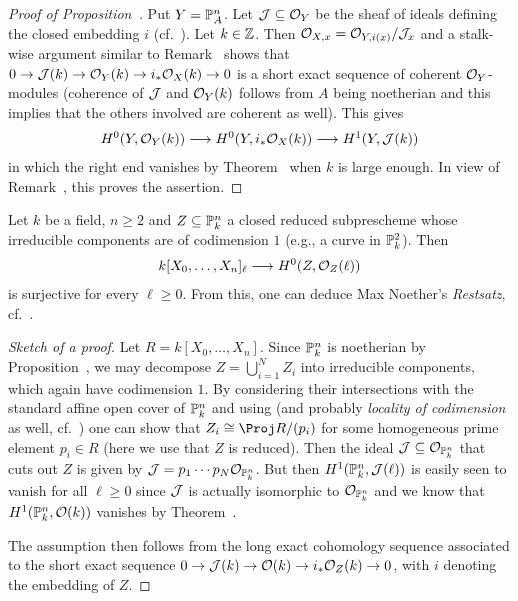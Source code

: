\documentclass[a4paper,parskip=half,numbers=enddot, DIV=12]{scrreprt}
\renewcommand{\geq}{\geqslant}
\begin{document}
\begin{proof}[Proof of Proposition~]
	Put $Y=\mathbb{P}_A^n$. Let $\mathcal{J}\subseteq \mathcal{O}_Y$ be the sheaf of ideals defining the closed embedding $i$ (cf.\ \cite[Corollary~1.5.3]{alggeo1}). Let $k\in\mathbb{Z}$. Then $\mathcal{O}_{X,x}=\mathcal{O}_{Y,i(x)}/\mathcal{J}_x$ and a stalk-wise argument similar to Remark~ shows that $0\morphism \Jj(k)\morphism \Oo_Y(k)\morphism i_*\Oo_X(k)\morphism 0$ is a short exact sequence of coherent $\mathcal{O}_Y$-modules (coherence of $\mathcal{J}$ and $\mathcal{O}_Y(k)$ follows from $A$ being noetherian and this implies that the others involved are coherent as well). This gives
	\begin{align*}
		H^0(Y,\Oo_Y(k))\morphism H^0(Y,i_*\Oo_X(k))\morphism H^1(Y,\Jj(k))
	\end{align*}
	in which the right end vanishes by Theorem~ when $k$ is large enough. In view of Remark~, this proves the assertion.
\end{proof}
\begin{exc}
	Let $k$ be a field, $n\geq 2$ and $Z\subseteq \mathbb{P}_k^n$ a closed reduced subprescheme whose irreducible components are of codimension $1$ (e.g., a curve in $\mathbb{P}_k^2$). Then
	\begin{align*}
		k[X_0,\ldots,X_n]_\ell\morphism H^0(Z,\Oo_Z(\ell))
	\end{align*}
	is surjective for every $\ell\geq 0$. From this, one can deduce Max Noether's \emph{Restsatz}, cf.\ \cite[Theorem~23]{alg2}.
\end{exc}
\begin{proof}[Sketch of a proof]
	Let $R=k[X_0,\ldots,X_n]$. Since $\mathbb{P}_k^n$ is noetherian by Proposition~, we may decompose $Z=\bigcup_{i=1}^NZ_i$ into irreducible components, which again have codimension $1$. By considering their intersections with the standard affine open cover of $\mathbb{P}_k^n$ and using \cite[Proposition~2.1.3]{alg1} (and probably \emph{locality of codimension} as well, cf.\ \cite[Remark~2.1.3]{alg1}) one can show that $Z_i\cong \Proj R/(p_i)$ for some homogeneous prime element $p_i\in R$ (here we use that $Z$ is reduced). Then the ideal $\mathcal{J}\subseteq \mathcal{O}_{\mathbb{P}_k^n}$ that cuts out $Z$ is given by $\mathcal{J}=p_1\cdots p_N\mathcal{O}_{\mathbb{P}_k^n}$. But then $H^1(\mathbb{P}_k^n,\mathcal{J}(\ell))$ is easily seen to vanish for all $\ell\geq 0$ since $\mathcal{J}$ is actually isomorphic to $\mathcal{O}_{\mathbb{P}_k^n}$ and we know that $H^1(\mathbb{P}_k^n,\mathcal{O}(k))$ vanishes by Theorem~. 
	
	The assumption then follows from the long exact cohomology sequence associated to the short exact sequence $0\morphism \Jj(k)\morphism \Oo(k)\morphism i_*\Oo_Z(k)\morphism 0$, with $i$ denoting the embedding of $Z$.
\end{proof}
\end{document}
